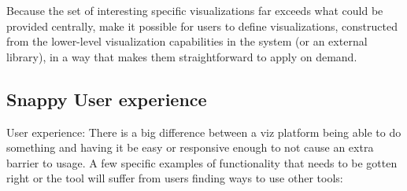 Because the set of interesting specific visualizations far exceeds what could be provided centrally, make it possible for users to define visualizations, constructed from the lower-level visualization capabilities in the system (or an external library), in a way that makes them straightforward to apply on demand.

\subsection{Snappy User experience}
User experience:
There is a big difference between a viz platform being able to do something and having it be easy or responsive enough to not cause an extra barrier to usage.  A few specific examples of functionality that needs to be gotten right or the tool will suffer from users finding ways to use other tools:
